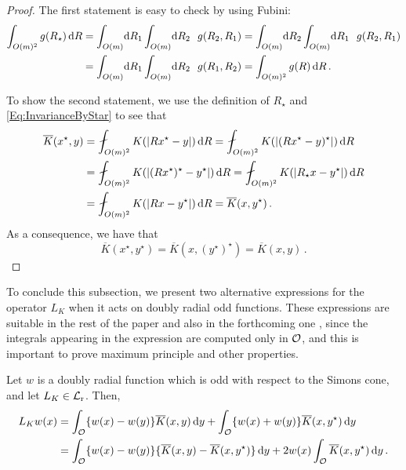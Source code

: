 \begin{proof}
The first statement is easy to check by using Fubini:
\begin{align*}
\int_{O(m)^2} g(R_\star) \d R & = \int_{O(m)} \!\! \d R_1 \int_{O(m)} \!\! \d R_2 \ \ g(R_2, R_1)  =  \int_{O(m)} \!\! \d R_2 \int_{O(m)} \!\! \d R_1 \ \ g(R_2, R_1) \\
& =  \int_{O(m)} \!\! \d R_1 \int_{O(m)} \!\! \d R_2 \ \ g(R_1, R_2)  =  \int_{O(m)^2} g(R) \d R\,.
\end{align*}

To show the second statement, we use the definition of $R_\star$ and \eqref{Eq:InvarianceByStar}
to see that
\begin{align*}
\overline{K}(x^\star,y) &= \average_{O(m)^2} K(|Rx^\star - y|) \d R = \average_{O(m)^2} K(|(Rx^\star - y)^\star|) \d R \\
&= \average_{O(m)^2} K(|(R x^\star)^\star - y^\star|) \d R = \average_{O(m)^2} K(|R_\star x - y^\star|) \d R \\
&= \average_{O(m)^2} K(|Rx - y^\star|) \d R = \overline{K}(x,y^\star)\,.
\end{align*}
As a consequence, we have that
$$\overline{K}(x^\star,y^\star) = \overline{K}(x,(y^\star)^\star) = \overline{K}(x,y)\,.$$
\end{proof}

To conclude this subsection, we present two alternative expressions for the operator $L_K$ when it acts on doubly radial odd functions. These expressions are suitable in the rest of the paper and also in the forthcoming one \cite{FelipeSanz-Perela:IntegroDifferentialII}, since the integrals appearing in the expression are computed only in $\mathcal{O}$, and this is important to prove maximum principle and other properties.

\begin{lemma}
	\label{Lemma:OperatorOddF}
	Let $w$ is a doubly radial function which is odd with respect to the Simons cone, and let $L_K \in \mathcal{L}_{\mathrm{r}}$. Then,
	\begin{align*}
	L_K w (x) &= \int_{\mathcal{O}} \{w(x) - w(y) \} \overline{K}(x, y) \,\mathrm{d} y +  \int_{\mathcal{O}} \{w(x) + w(y) \} \overline{K}(x, y^\star) \,\mathrm{d} y \\
	&= \int_{\mathcal{O}} \{w(x) - w(y) \} \{\overline{K}(x, y) - \overline{K}(x, y^\star)  \} \,\mathrm{d} y +  2 w(x) \int_{\mathcal{O}} \overline{K}(x, y^\star) \,\mathrm{d} y \,.
	\end{align*}
\end{lemma}

